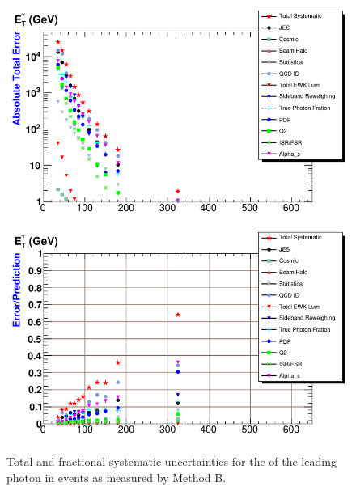 \begin{figure}[p]
 \centering
 \includegraphics[scale=.7,keepaspectratio=true]{./G30Jets_Errs_MtdB_plot1_Et_pho.pdf}
 \caption{Total and fractional systematic uncertainties for the \et of the leading photon in \phoonejet events as measured by Method B.}
 \label{fig:g30Jets_Errs_MtdB_plot1_Et_pho}
\end{figure}


